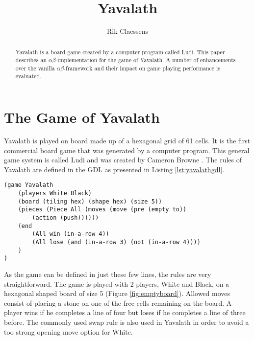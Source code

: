 \documentclass[11pt]{article}
\begin{document}
\title{{\Huge Yavalath} \\ \vspace{0.5em}{\large August 2014 - Intelligent Search \& Games\\ Master Artificial Intelligence, Maastricht University}}	
\author{Rik Claessens}

\maketitle

\begin{abstract}
Yavalath is a board game created by a computer program called Ludi. This paper describes an $\alpha\beta$-implementation for the game of Yavalath. A number of enhancements over the vanilla $\alpha \beta$-framework and their impact on game playing performance is evaluated.
\end{abstract}

\section{The Game of Yavalath}
\label{-sec:thegameofyavalath}
Yavalath is played on board made up of a hexagonal grid of 61 cells. It is the first commercial board game that was generated by a computer program. This general game system is called Ludi and was created by Cameron Browne \cite{browne2011evolutionary}. The rules of Yavalath are defined in the \ac{GDL} as presented in Listing \ref{lst:yavalathgdl}. 

\listingspace
\begin{lstlisting}[caption={The Yavalath definition in GDL}]
(game Yavalath
	(players White Black)
	(board (tiling hex) (shape hex) (size 5))
	(pieces (Piece All (moves (move (pre (empty to))
		(action (push)))))) 
	(end
		(All win (in-a-row 4))
		(All lose (and (in-a-row 3) (not (in-a-row 4))))
	)
)
\end{lstlisting}
\label{lst:yavalathgdl}
\listingspace

As the game can be defined in just these few lines, the rules are very straightforward. The game is played with 2 players, White and Black, on a hexagonal shaped board of size 5 (Figure \ref{fig:emptyboard}). Allowed moves consist of placing a stone on one of the free cells remaining on the board. A player wins if he completes a line of four but loses if he completes a line of three before. The commonly used swap rule is also used in Yavalath in order to avoid a too strong opening move option for White. 
\end{document}
